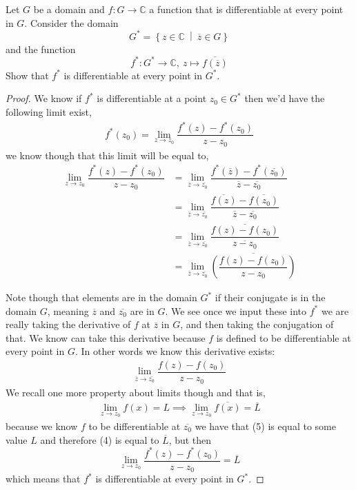 \documentclass[11pt]{article}
\newenvironment{problem}[2][Problem\!]{\begin{trivlist}
\item[\hskip \labelsep {\bfseries #1}\hskip \labelsep {\bfseries #2}]}{\end{trivlist}}
\newcommand{\cc}{\mathbb C}   %
\newcommand{\setp}[2]{\left\{#1\ \middle|\ #2\right\}} %
\newcommand{\lrp}[1]{\left(#1\right)}
\begin{document}
\begin{problem}{3.4}
Let $G$ be a domain and $f: G \to \cc$ a function that is differentiable at every point in $G$. Consider the domain
\[G^* = \setp{z \in \cc}{\overline{z} \in G}\]
and the function 
\[f^*:G^* \to \cc,\ z \mapsto \overline{f(\overline{z})}\]
Show that $f^*$ is differentiable at every point in $G^*$.
\end{problem}
\begin{proof}
  We know if $f^{*}$ is differentiable at a point $z_0 \in G^{*}$ then we'd have the following limit exist,
  \begin{align*}
    f^{*}(z_0) = \lim_{z\to z_0}\dfrac{f^{*} (z) - f^{*} (z_0)}{z-z_0 }
  \end{align*}
  we know though that this limit will be equal to,
  \begin{align}
    \lim_{z\to z_0}\dfrac{f^{*} (z) - f^{*} (z_0)}{z-z_0 } &= \lim_{\overline{z} \to \overline{z_0}}\dfrac{f^{*}(\overline{z}) - f^{*}(\overline{z_0})}{\overline{z} - \overline{z_0}} \\
    &= \lim_{\overline{z} \to \overline{z_0}} \dfrac{\overline{f(z)} - \overline{f(z_0)}}{\overline{z} - \overline{z_0}} \\
    &=\lim_{\overline{z} \to \overline{z_0}} \dfrac{\overline{f(z) -f(z_0)}}{\overline{  z -z_0}} \\
    &= \lim_{\overline{z} \to \overline{z_0}}\overline{ \lrp{\dfrac{f(z) -f(z_0)}{z -z_0}}} 
  \end{align}
  
  Note though that elements are in the domain $G^{*}$ if their conjugate is in the domain $G$, meaning $\overline{z}$ and $\overline{z_0}$ are in $G$. We see once we input these into $f^{*}$ we are really taking the derivative of $f$ at $\overline{z}$ in $G$, and then taking the conjugation of that. We know can take this derivative because $f$ is defined to be differentiable at every point in $G$. In other words we know this derivative exists:
  \begin{align}
    \lim_{\overline{z} \to \overline{z_0}} \dfrac{f(z) -f(z_0)}{z -z_0}
  \end{align}
  We recall one more property about limits though and that is,
  \begin{align*}
    \lim_{z\to z_0}f(x) = L \implies \lim_{z\to z_0}\overline{f(x)} = \overline{L}
  \end{align*}
  because we know $f$ to be differentiable at $\overline{z_0}$ we have that (5) is equal to some value $L$ and therefore (4) is equal to $\overline{L}$, but then
  \[\lim_{z\to z_0}\dfrac{f^{*} (z) - f^{*} (z_0)}{z-z_0 } = \overline{L}\]
  which means that $f^{*}$ is differentiable at every point in $G^{*}$.

\end{proof}
\end{document}
